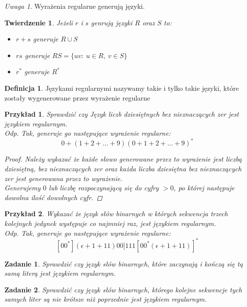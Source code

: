 \documentclass[12pt,a4paper]{article}
\newtheorem{tw}{Twierdzenie}
\newtheorem{przyklad}{Przykład}
\newtheorem{zad}{Zadanie}
\theoremstyle{definition}
\newtheorem{df}{Definicja}
\theoremstyle{remark}
\newtheorem{uwaga}{Uwaga}
\begin{document}
	\begin{uwaga}
	Wyrażenia regularne generują języki.
	\end{uwaga}
	
	\begin{tw}
		Jeżeli $r$ i $s$ genrują języki $R$ oraz $S$ to:
		\begin{itemize}
			\item $r+s$ generuje $R\cup S$
			\item $rs$ generuje $RS = \{uv: ~ u\in R, ~ v\in S\}$
			\item $r^*$ generuje $R^*$
		\end{itemize}
	\end{tw}
	
	\begin{df}
		Językami regularnymi nazywamy takie i tylko takie języki, które zostały wygenerowane przez wyrażenie regularne
	\end{df}	
	
	\begin{przyklad}
		Sprawdzić czy Język liczb dziesiętnych bez nieznaczących zer jest językiem regularnym. \\
		\emph{Odp.} Tak, generuje go następujące wyrażenie regularne:
		$$  0 + (1+2+\dots+9)(0+1+2+\dots+9)^* $$
		\begin{proof}
			Należy wykazać że każde słowo generowane przez to wyrażenie jest liczbą dziesiętną, bez nieznaczących zer oraz każda liczba 
			dziesiętna bez nieznaczących zer jest generowana przez to wyrażenie.\\
			Generujemy $0$ lub liczbę rozpoczynającą się do cyfry $> 0$, po której następuje dowolna ilość dowolnych cyfr.
		\end{proof}
	\end{przyklad}		
	
	\begin{przyklad}
		Wykazać że język słów binarnych w których sekwencja trzech kolejnych jedynek występuje co najmniej raz,
		jest językiem regularnym. \\
		\emph{Odp.} Tak, generuje go następujące wyrażenie regularne:
		$$[00^*](\epsilon+1+11)00]111[00^*(\epsilon+1+11)]^* $$
	\end{przyklad}
	
	\begin{zad}
		Sprawdzić czy język słów binarnych, które zaczynają i kończą się tą samą literą jest językiem regularnym.
	\end{zad}
	\begin{zad}
		Sprawdzić czy język słów binarnych, którego kolejne sekwencje tych samych liter są nie krótsze niż poprzednie jest językiem regularnym.
	\end{zad}
	
\end{document}
